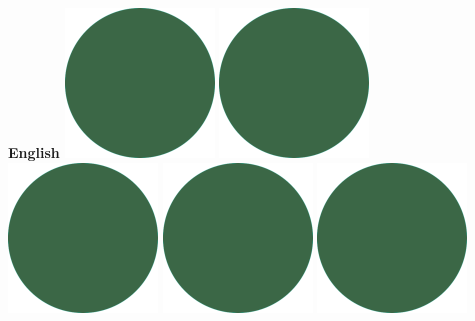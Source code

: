 \documentclass[]{commands}
\begin{document}
\begin{aside}
\textbf{English}\hfill
\includegraphics[scale=0.11]{img/IPSGreenDots.png}
\includegraphics[scale=0.11]{img/IPSGreenDots.png}
\includegraphics[scale=0.11]{img/IPSGreenDots.png}
\includegraphics[scale=0.11]{img/IPSGreenDots.png}
\includegraphics[scale=0.11]{img/IPSGreenDots.png}


\end{aside}
\end{document}
